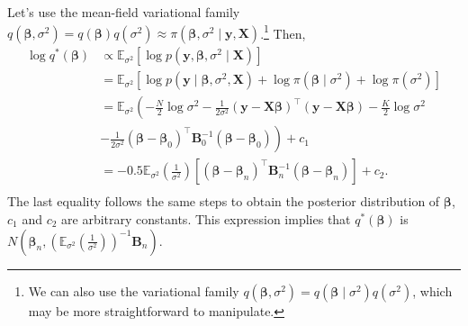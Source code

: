 Let's use the mean-field variational family $q(\boldsymbol{\beta},\sigma^2)=q(\boldsymbol{\beta})q(\sigma^2)\approx \pi(\boldsymbol{\beta},\sigma^2\mid\boldsymbol{y},\boldsymbol{X})$.\footnote{We can also use the variational family $q(\boldsymbol{\beta},\sigma^2)=q(\boldsymbol{\beta}\mid\sigma^2)q(\sigma^2)$, which may be more straightforward to manipulate.} Then,
\begin{align*}
	\log q^*(\boldsymbol{\beta})&\propto\mathbb{E}_{\sigma^2}[\log p(\boldsymbol{y},\boldsymbol{\beta},\sigma^2\mid\boldsymbol{X})]\\
	&=\mathbb{E}_{\sigma^2}[\log p(\boldsymbol{y}\mid\boldsymbol{\beta},\sigma^2,\boldsymbol{X}) +\log \pi(\boldsymbol{\beta}\mid\sigma^2)+\log \pi(\sigma^2)]\\
	&=\mathbb{E}_{\sigma^2}\left(-\frac{N}{2}\log\sigma^2-\frac{1}{2\sigma^2}(\boldsymbol{y}-\boldsymbol{X}\boldsymbol{\beta})^{\top}(\boldsymbol{y}-\boldsymbol{X}\boldsymbol{\beta})-\frac{K}{2}\log\sigma^2\right.\\
	&\left.-\frac{1}{2\sigma^2}(\boldsymbol{\beta}-\boldsymbol{\beta}_0)^{\top}\boldsymbol{B}_0^{-1}(\boldsymbol{\beta}-\boldsymbol{\beta}_0)\right)+c_1\\
	&=-0.5\mathbb{E}_{\sigma^2}\left(\frac{1}{\sigma^2}\right)[(\boldsymbol{\beta}-\boldsymbol{\beta}_n)^{\top}\boldsymbol{B}_n^{-1}(\boldsymbol{\beta}-\boldsymbol{\beta}_n)]+c_2.\\
\end{align*}
The last equality follows the same steps to obtain the posterior distribution of $\boldsymbol{\beta}$, $c_1$ and $c_2$ are arbitrary constants. This expression implies that $q^*(\boldsymbol{\beta})$ is $N\left(\boldsymbol{\beta}_n,\left(\mathbb{E}_{\sigma^2}\left(\frac{1}{\sigma^2}\right)\right)^{-1}\boldsymbol{B}_n\right)$.

